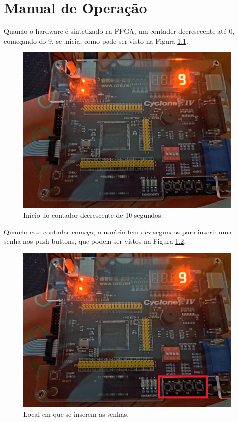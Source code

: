 \chapter{Manual de Operação}\label{cap_3_Metodologia}

Quando o hardware é sintetizado na FPGA, um contador decresecente até 0, começando do 9, se inicia, como pode ser visto na Figura \ref{fig:3.1}.

\begin{figure}[H]
	\centering
	\includegraphics[width=1\columnwidth]{FIGURAS/cap_3/placa9.jpg}
	\caption{Início do contador decrescente de 10 segundos.}
        \label{fig:3.1}
\end{figure}

Quando esse contador começa, o usuário tem dez segundos para inserir uma senha nos push-buttons, que podem ser vistos na Figura \ref{fig:3.2}. 

\begin{figure}[H]
	\centering
	\includegraphics[width=1\columnwidth]{FIGURAS/cap_3/localpb.png}
	\caption{Local em que se inserem as senhas.}
        \label{fig:3.2}
\end{figure}

